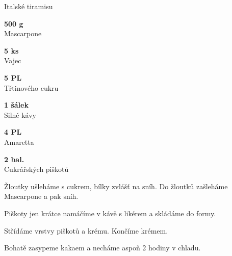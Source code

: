 \documentclass[11pt,a4paper]{article}
\begin{document}
\begin{recipe}[Maroon]{Italské tiramisu}
    \begin{ingredients}
        \item \parbox[t]{\linewidth}{\raggedright \weight \textbf{500 g}\\ Mascarpone}
        \item \parbox[t]{\linewidth}{\raggedright \piece \textbf{5 ks}\\ Vajec}
        \item \parbox[t]{\linewidth}{\raggedright \spoon \textbf{5 PL}\\ Třtinového cukru}
        \item \parbox[t]{\linewidth}{\raggedright \liquid \textbf{1 šálek}\\ Silné kávy}
        \item \parbox[t]{\linewidth}{\raggedright \liquid \textbf{4 PL}\\ Amaretta}
        \item \parbox[t]{\linewidth}{\raggedright \piece \textbf{2 bal.}\\ Cukrářských piškotů}
    \end{ingredients}
    \begin{steps}
        \item Žloutky ušleháme s cukrem, bílky zvlášť na sníh. Do žloutků zašleháme Mascarpone a pak sníh.
        \item Piškoty jen krátce namáčíme v kávě s likérem a skládáme do formy.
        \item Střídáme vrstvy piškotů a krému. Končíme krémem.
        \item Bohatě zasypeme kakaem a necháme aspoň 2 hodiny v chladu.
    \end{steps}
\end{recipe}

\end{document}
